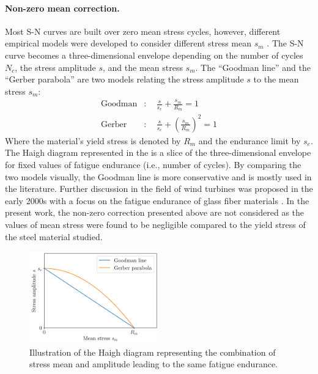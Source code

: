 \paragraph{Non-zero mean correction.}
Most S-N curves are built over zero mean stress cycles, however, different empirical models were developed to consider different stress mean $s_m$ \citep{suresh_1998_fatigue_book}. 
The S-N curve becomes a three-dimensional envelope depending on the number of cycles $N_c$, the stress amplitude $s$, and the mean stress $s_m$. 
The ``Goodman line'' and the ``Gerber parabola'' are two models relating the stress amplitude $s$ to the mean stress $s_m$:  
\begin{align}
    \mathrm{Goodman} &:\quad \frac{s}{s_e} + \frac{s_m}{R_m} = 1\\
    \mathrm{Gerber} &:\quad \frac{s}{s_e} + \left(\frac{s_m}{R_m}\right)^2 = 1
\end{align}
Where the material's yield stress is denoted by $R_m$ and the endurance limit by $s_e$. 
The Haigh diagram represented in the  is a slice of the three-dimensional envelope for fixed values of fatigue endurance (i.e., number of cycles). 
By comparing the two models visually, the Goodman line is more conservative and is mostly used in the literature. 
Further discussion in the field of wind turbines was proposed in the early 2000s with a focus on the fatigue endurance of glass fiber materials \citep{sutherland_2000_fatigueWT}. 
In the present work, the non-zero correction presented above are not considered as the values of mean stress were found to be negligible compared to the yield stress of the steel material studied. 

\begin{figure}
    \centering
    \includegraphics[width=0.5\textwidth]{../numerical_experiments/chapter2/figures/haigh_diagram.png}
    \caption{Illustration of the Haigh diagram representing the combination of stress mean and amplitude leading to the same fatigue endurance.}
    \label{fig:haigh_diagram}
\end{figure}



